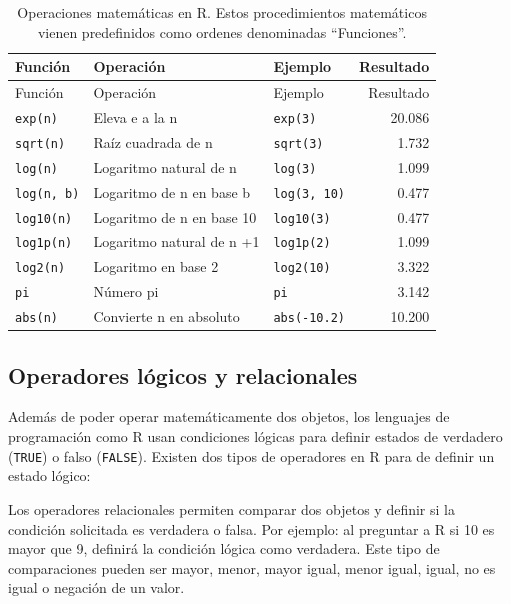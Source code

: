 \documentclass[
]{article}
\theoremstyle{definition}
\theoremstyle{definition}
\theoremstyle{definition}
\theoremstyle{definition}
\theoremstyle{remark}
\begin{document}
\begin{longtable}[]{@{}lllr@{}}
\caption{\label{tab:unnamed-chunk-6}Operaciones matemáticas en R. Estos procedimientos matemáticos vienen predefinidos como ordenes denominadas ``Funciones''.}\tabularnewline
\toprule()
Función & Operación & Ejemplo & Resultado \\
\midrule()
\endfirsthead
\toprule()
Función & Operación & Ejemplo & Resultado \\
\midrule()
\endhead
\texttt{exp(n)} & Eleva e a la n & \texttt{exp(3)} & 20.086 \\
\texttt{sqrt(n)} & Raíz cuadrada de n & \texttt{sqrt(3)} & 1.732 \\
\texttt{log(n)} & Logaritmo natural de n & \texttt{log(3)} & 1.099 \\
\texttt{log(n,\ b)} & Logaritmo de n en base b & \texttt{log(3,\ 10)} & 0.477 \\
\texttt{log10(n)} & Logaritmo de n en base 10 & \texttt{log10(3)} & 0.477 \\
\texttt{log1p(n)} & Logaritmo natural de n +1 & \texttt{log1p(2)} & 1.099 \\
\texttt{log2(n)} & Logaritmo en base 2 & \texttt{log2(10)} & 3.322 \\
\texttt{pi} & Número pi & \texttt{pi} & 3.142 \\
\texttt{abs(n)} & Convierte n en absoluto & \texttt{abs(-10.2)} & 10.200 \\
\bottomrule()
\end{longtable}

\hypertarget{operadores-luxf3gicos-y-relacionales}{%
\subsection{Operadores lógicos y relacionales}\label{operadores-luxf3gicos-y-relacionales}}

Además de poder operar matemáticamente dos objetos, los lenguajes de programación como R usan condiciones lógicas para definir estados de verdadero (\texttt{TRUE}) o falso (\texttt{FALSE}). Existen dos tipos de operadores en R para de definir un estado lógico:

Los operadores relacionales permiten comparar dos objetos y definir si la condición solicitada es verdadera o falsa. Por ejemplo: al preguntar a R si 10 es mayor que 9, definirá la condición lógica como verdadera. Este tipo de comparaciones pueden ser mayor, menor, mayor igual, menor igual, igual, no es igual o negación de un valor.
\end{document}
